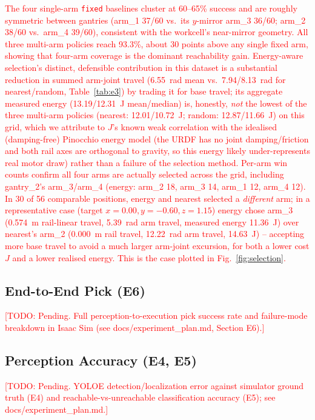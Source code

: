 \documentclass[conference]{IEEEtran}
\newcommand{\TODO}[1]{\textcolor{red}{[TODO: #1]}}
\begin{document}
\textcolor{red}{The four single-arm \texttt{fixed} baselines cluster at 60--65\%
success and are roughly symmetric between gantries (arm\_1 37/60 vs.\ its
$y$-mirror arm\_3 36/60; arm\_2 38/60 vs.\ arm\_4 39/60), consistent with the
workcell's near-mirror geometry. All three multi-arm policies reach 93.3\%, about
30 points above any single fixed arm, showing that four-arm coverage is the
dominant reachability gain. Energy-aware selection's distinct, defensible
contribution in this dataset is a substantial reduction in summed arm-joint travel
(6.55~rad mean vs.\ 7.94/8.13~rad for nearest/random, Table~\ref{tab:e3}) by
trading it for base travel; its aggregate measured energy (13.19/12.31~J
mean/median) is, honestly, \emph{not} the lowest of the three multi-arm
policies (nearest: 12.01/10.72~J; random: 12.87/11.66~J) on this grid, which we
attribute to $J$'s known weak correlation with the idealised (damping-free)
Pinocchio energy model (the URDF has no joint damping/friction and both rail axes
are orthogonal to gravity, so this energy likely under-represents real motor
draw) rather than a failure of the selection method. Per-arm
win counts confirm all four arms are actually selected across the grid, including
gantry\_2's arm\_3/arm\_4 (energy: arm\_2 18, arm\_3 14, arm\_1 12, arm\_4 12).
In 30 of 56 comparable positions, energy and nearest selected a \emph{different}
arm; in a representative case (target $x{=}0.00,y{=}-0.60,z{=}1.15$) energy chose
arm\_3 (0.574~m rail-linear travel, 5.39~rad arm travel, measured energy 11.36~J)
over nearest's arm\_2 (0.000~m rail travel, 12.22~rad arm travel, 14.63~J) --
accepting more base travel to avoid a much larger arm-joint excursion, for both a
lower cost $J$ and a lower realised energy. This is the case plotted in
Fig.~\ref{fig:selection}.}

\subsection{End-to-End Pick (E6)}
\TODO{Pending. Full perception-to-execution pick success rate and failure-mode
breakdown in Isaac Sim (see docs/experiment\_plan.md, Section E6).}

\subsection{Perception Accuracy (E4, E5)}
\TODO{Pending. YOLOE detection/localization error against simulator ground truth
(E4) and reachable-vs-unreachable classification accuracy (E5); see
docs/experiment\_plan.md.}
\end{document}

